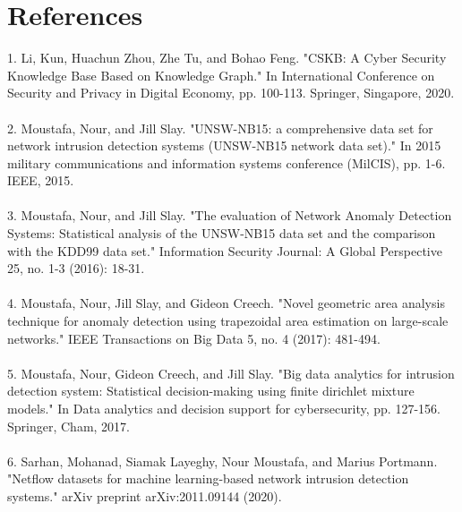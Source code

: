\documentclass[
11pt, %
letterpaper, %
oneside, %
headinclude,footinclude, %
BCOR5mm, %
]{scrartcl}
\begin{document}

\section*{References}

1. Li, Kun, Huachun Zhou, Zhe Tu, and Bohao Feng. "CSKB: A Cyber Security Knowledge Base Based on Knowledge Graph." In International Conference on Security and Privacy in Digital Economy, pp. 100-113. Springer, Singapore, 2020.\\\\
2. Moustafa, Nour, and Jill Slay. "UNSW-NB15: a comprehensive data set for network intrusion detection systems (UNSW-NB15 network data set)." In 2015 military communications and information systems conference (MilCIS), pp. 1-6. IEEE, 2015.\\\\
3. Moustafa, Nour, and Jill Slay. "The evaluation of Network Anomaly Detection Systems: Statistical analysis of the UNSW-NB15 data set and the comparison with the KDD99 data set." Information Security Journal: A Global Perspective 25, no. 1-3 (2016): 18-31.\\\\
4. Moustafa, Nour, Jill Slay, and Gideon Creech. "Novel geometric area analysis technique for anomaly detection using trapezoidal area estimation on large-scale networks." IEEE Transactions on Big Data 5, no. 4 (2017): 481-494.\\\\
5. Moustafa, Nour, Gideon Creech, and Jill Slay. "Big data analytics for intrusion detection system: Statistical decision-making using finite dirichlet mixture models." In Data analytics and decision support for cybersecurity, pp. 127-156. Springer, Cham, 2017.\\\\
6. Sarhan, Mohanad, Siamak Layeghy, Nour Moustafa, and Marius Portmann. "Netflow datasets for machine learning-based network intrusion detection systems." arXiv preprint arXiv:2011.09144 (2020).

\end{document}
